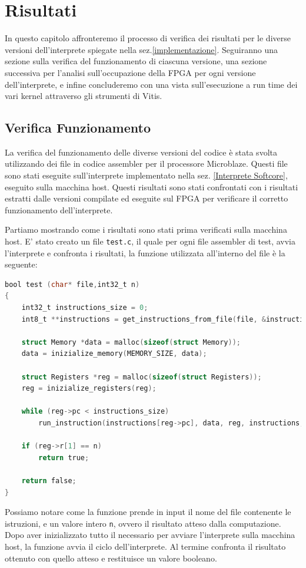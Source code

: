 \chapter{Risultati}
In questo capitolo affronteremo il processo di verifica dei risultati per le diverse versioni dell'interprete spiegate nella sez.\ref{implementazione}. Seguiranno una sezione sulla verifica del funzionamento di ciascuna versione, una sezione successiva per l'analisi sull'occupazione della FPGA per ogni versione dell'interprete, e infine concluderemo con una vista sull'esecuzione a run time dei vari kernel attraverso gli strumenti di Vitis.

\section{Verifica Funzionamento}
La verifica del funzionamento delle diverse versioni del codice è stata svolta utilizzando dei file in codice assembler per il processore Microblaze. Questi file sono stati eseguite sull'interprete implementato nella sez. \ref{Interprete Softcore}, eseguito sulla macchina host. Questi risultati sono stati confrontati con i risultati estratti dalle versioni compilate ed eseguite sul FPGA per verificare il corretto funzionamento dell'interprete.

Partiamo mostrando come i risultati sono stati prima verificati sulla macchina host.
E' stato creato un file \texttt{test.c}, il quale per ogni file assembler di test, avvia l'interprete e confronta i risultati, la funzione utilizzata all'interno del file è la seguente:
\begin{lstlisting}[language=C]
bool test (char* file,int32_t n) 
{
    int32_t instructions_size = 0;
    int8_t **instructions = get_instructions_from_file(file, &instructions_size);

    struct Memory *data = malloc(sizeof(struct Memory));
    data = inizialize_memory(MEMORY_SIZE, data);

    struct Registers *reg = malloc(sizeof(struct Registers));
    reg = inizialize_registers(reg);

    while (reg->pc < instructions_size)
        run_instruction(instructions[reg->pc], data, reg, instructions, false);

    if (reg->r[1] == n)
        return true;
        
    return false;
}
\end{lstlisting}

Possiamo notare come la funzione prende in input il nome del file contenente le istruzioni, e un valore intero \texttt{n}, ovvero il risultato atteso dalla computazione. 
Dopo aver inizializzato tutto il necessario per avviare l'interprete sulla macchina host, la funzione avvia il ciclo dell'interprete. Al termine confronta il risultato ottenuto con quello atteso e restituisce un valore booleano.

